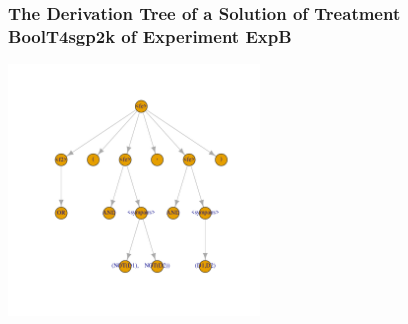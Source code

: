  \begin{frame}
 \frametitle{ The Derivation Tree of a Solution of Treatment BoolT4sgp2k of Experiment ExpB }
 \begin{center}
\includegraphics[width=0.5\textwidth, angle=0]
{ExpBDerivationTreeFigure020.pdf}
 \end{center}
 \label{report/ExpBDerivationTreeFigure020.pdf}  
 \end{frame}

